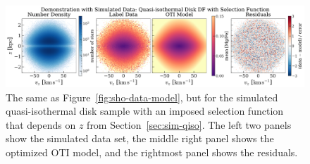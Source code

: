 \documentclass[modern]{aastex631}
\begin{document}



\begin{figure}[t!]
\begin{center}
\includegraphics[width=\textwidth]{qiso-sel-data-model.pdf}
\end{center}
\caption{%
The same as Figure~\ref{fig:sho-data-model}, but for the simulated quasi-isothermal disk
sample with an imposed selection function that depends on $z$ from
Section~\ref{sec:sim-qiso}.
The left two panels show the simulated data set, the middle right panel shows the
optimized OTI model, and the rightmost panel shows the residuals.
\label{fig:qiso-sel-data-model}
}
\end{figure}
\end{document}
